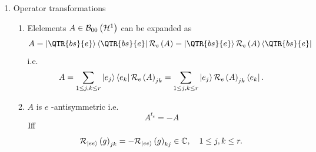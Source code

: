 \begin{enumerate}
\begin{enumerate}
\item If $W\in U\left( {\cal H}^{1}\right) $ 
\begin{gather}
{\cal R}_{\left\vert ff\right\rangle }\left( g\right) =\overline{{\cal R}%
_{e}\left( W\right) }{\cal R}_{\left\vert ee\right\rangle }\left( g\right) 
{\cal R}_{e}\left( W\right) ^{\dagger } \\
\Updownarrow \\
{\cal R}_{\left\vert ee\right\rangle }\left( g\right) ={\cal R}_{e}\left(
W\right) ^{t}{\cal R}_{\left\vert ff\right\rangle }\left( g\right) {\cal R}%
_{e}\left( W\right) ..
\end{gather}
\end{enumerate}

\item Operator transformations

\begin{enumerate}
\item Elelements $A\in {\cal B}_{00}\left( {\cal H}^{1}\right) $ can be
expanded as 
\begin{equation}
A=\left\vert \QTR{bs}{e}\right\rangle \left\langle \QTR{bs}{e}\right\vert 
{\cal R}_{e}\left( A\right) =\left\vert \QTR{bs}{e}\right\rangle {\cal R}%
_{e}\left( A\right) \left\langle \QTR{bs}{e}\right\vert
\end{equation}%
i.e. 
\begin{equation}
A=\sum_{1\leq j,k\leq r}\left\vert e_{j}\right\rangle \left\langle
e_{k}\right\vert {\cal R}_{e}\left( A\right) _{jk}=\sum_{1\leq j,k\leq
r}\left\vert e_{j}\right\rangle {\cal R}_{e}\left( A\right)
_{jk}\left\langle e_{k}\right\vert .
\end{equation}

\item $A$ is $e$ -antisymmetric i.e. 
\begin{equation}
A^{t_{e}}=-A
\end{equation}%
$%
\mathop{\rm Iff}%
$ 
\begin{equation}
{\cal R}_{\left\vert ee\right\rangle }\left( g\right) _{jk}=-{\cal R}%
_{\left\vert ee\right\rangle }\left( g\right) _{kj}\in {\Bbb C},\quad 1\leq
j,k\leq r.
\end{equation}


\end{enumerate}
\end{enumerate}
